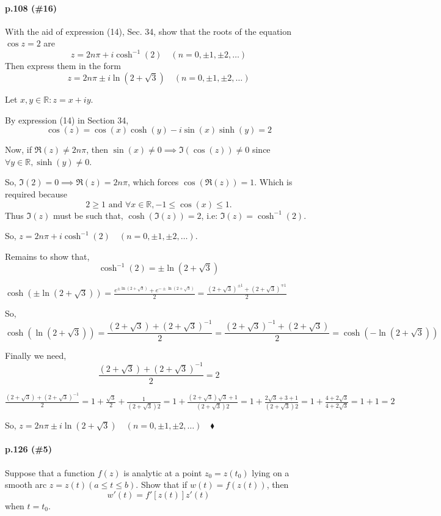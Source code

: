 \documentclass{article}
\newcommand\R{\mathbb{R}}
\begin{document}
\paragraph{p.108 \color{blue}(\#16)\color{black}}

With the aid of expression (14), Sec. 34, show that the roots of the equation $\cos z = 2$
are
\[z = 2n\pi +i\cosh^{-1}(2)\quad (n = 0,\pm 1,\pm 2,\dots)\]
Then express them in the form
\[z = 2n\pi \pm i\ln(2+\sqrt{3})\quad (n = 0,\pm 1,\pm 2,\dots)\]


Let $x,y \in \R: z= x+iy$.

By expression (14) in Section 34,
\[\cos(z) = \cos(x) \cosh(y) − i \sin(x)\sinh(y) = 2\]

Now, if $\Re(z) \neq 2n\pi$, then $\sin(x)\neq 0 \implies
\Im(\cos(z))\neq 0$ since $\forall y\in\R, \sinh(y)\neq 0$.

So, $\Im(2) = 0 \implies \Re(z) = 2n\pi$, which forces $\cos(\Re(z)) =1$. Which
is required because \[2\geq 1\text{ and }\forall x\in \R, -1\leq \cos(x)\leq
1.\] Thus $\Im(z)$ must be such that,
$\cosh(\Im(z)) = 2$, i.e: $\Im(z) = \cosh^{-1}(2)$.

So, $z = 2n\pi +i\cosh^{-1}(2)\quad (n = 0,\pm 1,\pm 2,\dots)$.

Remains to show that, \[\cosh^{-1}(2) = \pm\ln(2+\sqrt{3})\]

$\cosh(\pm\ln(2+\sqrt{3})) = \frac{e^{\pm\ln(2+\sqrt{3})} +
  e^{-\pm\ln(2+\sqrt{3})}}{2}  = \frac{(2+\sqrt{3})^{\pm 1}
  +(2+\sqrt{3})^{\mp 1}}{2}$

So, \[\cosh(\ln(2+\sqrt{3})) = \frac{(2+\sqrt{3})
  +(2+\sqrt{3})^{-1}}{2} =  \frac{(2+\sqrt{3})^{-1}
  +(2+\sqrt{3})}{2} = \cosh(-\ln(2+\sqrt{3}))\]

Finally we need, \[\frac{(2+\sqrt{3})
    +(2+\sqrt{3})^{-1}}{2} = 2\]

$\frac{(2+\sqrt{3})
  +(2+\sqrt{3})^{-1}}{2} = 1 + \frac{\sqrt{3}}{2} +
\frac{1}{(2+\sqrt{3})2} = 1 +
\frac{(2+\sqrt{3})\sqrt{3}+1}{(2+\sqrt{3})2} = 1 +
\frac{2\sqrt{3}+3+1}{(2+\sqrt{3})2} =
1+\frac{4+2\sqrt{3}}{4+2\sqrt{3}} = 1+1 = 2$

So, $z = 2n\pi \pm i\ln(2+\sqrt{3})\quad (n = 0,\pm 1, \pm 2,\dots)
\quad \blacklozenge$
\newpage
\paragraph{\color{blue} p.126 (\#5)\color{black}}

Suppose that a function $f(z)$ is analytic at a point $z_0 = z(t_0)$
lying on a smooth arc $z = z(t) (a \leq t\leq b).$ Show that if $w(t)
= f(z(t))$, then
\[ w'(t) = f'[z(t)]z'(t)\]
when $t = t_0.$
\end{document}
